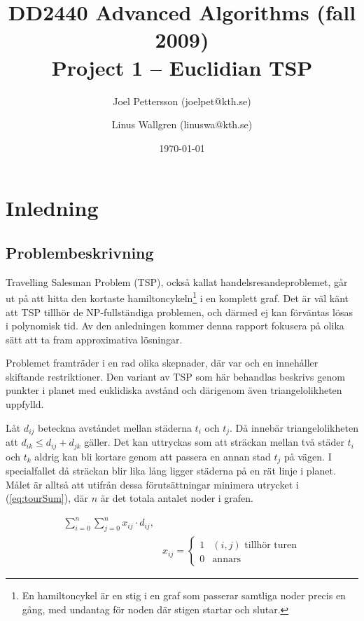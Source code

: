 \documentclass[a4paper,12pt]{article}
\renewcommand{\*}{\ensuremath{\cdot}}
\begin{document}
\title{DD2440 Advanced Algorithms (fall 2009) \\ Project 1 -- Euclidian TSP}
\author{Joel Pettersson (joelpet@kth.se) \and Linus Wallgren (linuswa@kth.se)}
\date{\today}
\maketitle
\thispagestyle{empty}
\newpage
\setcounter{page}{1}


\section{Inledning}


\subsection{Problembeskrivning} 

Travelling Salesman Problem (TSP), också kallat handelsresandeproblemet, går ut
på att hitta den kortaste hamiltoncykeln\footnote{En hamiltoncykel är en stig i
en graf som passerar samtliga noder precis en gång, med undantag för noden där
stigen startar och slutar.} i en komplett graf. Det är väl känt att TSP tillhör
de NP-fullständiga problemen, och därmed ej kan förväntas lösas i polynomisk
tid. Av den anledningen kommer denna rapport fokusera på olika sätt att ta fram
approximativa lösningar.

Problemet framträder i en rad olika skepnader, där var och en innehåller
skiftande restriktioner. Den variant av TSP som här behandlas beskrivs genom
punkter i planet med euklidiska avstånd och därigenom även triangelolikheten
uppfylld.

Låt $d_{ij}$ beteckna avståndet mellan städerna $t_i$ och $t_j$. Då innebär
triangelolikheten att $d_{ik} \leq d_{ij} + d_{jk}$ gäller. Det kan uttryckas
som att sträckan mellan två städer $t_i$ och $t_k$ aldrig kan bli kortare genom
att passera en annan stad $t_j$ på vägen. I specialfallet då sträckan blir lika
lång ligger städerna på en rät linje i planet. Målet är alltså att utifrån dessa
förutsättningar minimera utrycket i (\ref{eq:tourSum}), där $n$ är det totala
antalet noder i grafen.

\begin{align}
    \sum_{i=0}^{n}{\sum_{j=0}^{n}{x_{ij} \cdot d_{ij}}},  & \\
    & x_{ij} =
    \begin{cases}
        1 & (i,j) \textrm{ tillhör turen} \\
        0 & \textrm{annars}
    \end{cases}
    \label{eq:tourSum}
\end{align}
\end{document}

